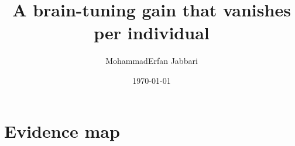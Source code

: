 \documentclass[11pt]{article}
\title{A brain-tuning gain that vanishes per individual}
\author{MohammadErfan Jabbari}
\date{\today}
\begin{document}
\maketitle
\begin{abstract}
\end{abstract}

% 

\appendix
\section{Evidence map}

\printbibliography
\end{document}
